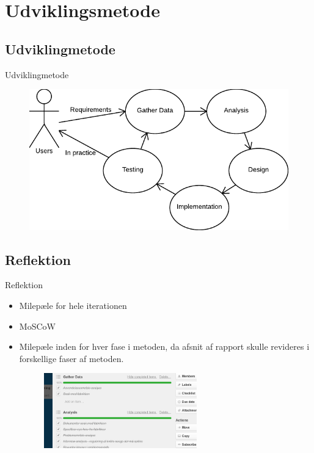 \section{Udviklingsmetode}

\subsection{Udviklingmetode}
\begin{frame}{Udviklingmetode}
  \begin{figure}
    \centering
    \includegraphics[width=\textwidth]{slides/Heider/Developmentprocess}
  \end{figure}
\end{frame}
\subsection{Reflektion}
\begin{frame}{Reflektion}
  \begin{itemize}
    \item Milepæle for hele iterationen
    \item MoSCoW
    \item Milepæle inden for hver fase i metoden, da afsnit af rapport skulle revideres i forskellige faser af metoden.
    \begin{figure}
      \centering
      \includegraphics[width=250px]{slides/Heider/trello}
    \end{figure}
  \end{itemize}
\end{frame}
